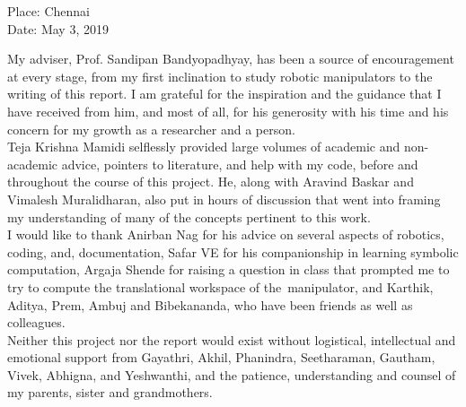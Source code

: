 \documentclass[DD]{iitmdiss}
\begin{document}
\noindent Place: Chennai\\
Date: May 3, 2019

\acknowledgements

My adviser, Prof. Sandipan Bandyopadhyay, has been a source of encouragement at every stage, from my first inclination to study robotic manipulators to the writing of this report. I am grateful for the inspiration and the guidance that I have received from him, and most of all, for his generosity with his time and his concern for my growth as a researcher and a person. \\
Teja Krishna Mamidi selflessly provided large volumes of academic and non-academic advice, pointers to literature, and help with my code, before and throughout the course of this project. He, along with Aravind Baskar and Vimalesh Muralidharan, also put in hours of discussion that went into framing my understanding of many of the concepts pertinent to this work.\\
I would like to thank Anirban Nag for his advice on several aspects of robotics, coding, and, documentation, Safar VE for his companionship in learning symbolic computation, Argaja Shende for raising a question in class that prompted me to try to compute the translational workspace of the~\rps manipulator, and Karthik, Aditya, Prem, Ambuj and Bibekananda, who have been friends as well as colleagues. \\
Neither this project nor the report would exist without logistical, intellectual and emotional support from Gayathri, Akhil, Phanindra, Seetharaman, Gautham, Vivek, Abhigna, and Yeshwanthi, and the patience, understanding and counsel of my parents, sister and grandmothers.
\end{document}
